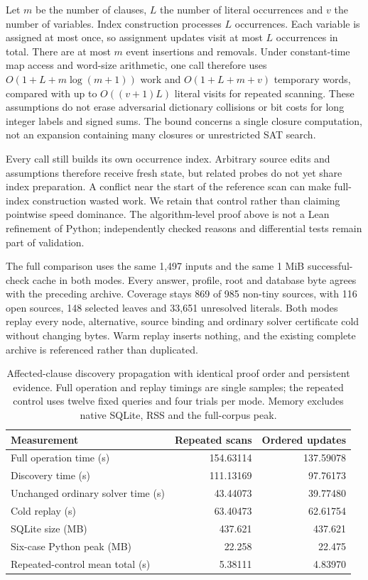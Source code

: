 \documentclass[11pt,a4paper]{article}
\numberwithin{equation}{section}
\theoremstyle{plain}
\theoremstyle{definition}
\theoremstyle{remark}
\begin{document}
Let $m$ be the number of clauses, $L$ the number of literal occurrences and $v$ the number of variables. Index construction processes $L$ occurrences. Each variable is assigned at most once, so assignment updates visit at most $L$ occurrences in total. There are at most $m$ event insertions and removals. Under constant-time map access and word-size arithmetic, one call therefore uses $O(1+L+m\log(m+1))$ work and $O(1+L+m+v)$ temporary words, compared with up to $O((v+1)L)$ literal visits for repeated scanning. These assumptions do not erase adversarial dictionary collisions or bit costs for long integer labels and signed sums. The bound concerns a single closure computation, not an expansion containing many closures or unrestricted SAT search.

Every call still builds its own occurrence index. Arbitrary source edits and assumptions therefore receive fresh state, but related probes do not yet share index preparation. A conflict near the start of the reference scan can make full-index construction wasted work. We retain that control rather than claiming pointwise speed dominance. The algorithm-level proof above is not a Lean refinement of Python; independently checked reasons and differential tests remain part of validation.

The full comparison uses the same 1,497 inputs and the same 1 MiB successful-check cache in both modes. Every answer, profile, root and database byte agrees with the preceding archive. Coverage stays 869 of 985 non-tiny sources, with 116 open sources, 148 selected leaves and 33,651 unresolved literals. Both modes replay every node, alternative, source binding and ordinary solver certificate cold without changing bytes. Warm replay inserts nothing, and the existing complete archive is referenced rather than duplicated.

\begin{table}[t]
\centering
\small
\begin{tabular}{lrr}
\toprule
Measurement & Repeated scans & Ordered updates \\
\midrule
Full operation time (s) & 154.63114 & 137.59078 \\
Discovery time (s) & 111.13169 & 97.76173 \\
Unchanged ordinary solver time (s) & 43.44073 & 39.77480 \\
Cold replay (s) & 63.40473 & 62.61754 \\
SQLite size (MB) & 437.621 & 437.621 \\
Six-case Python peak (MB) & 22.258 & 22.475 \\
Repeated-control mean total (s) & 5.38111 & 4.83970 \\
\bottomrule
\end{tabular}
\caption{Affected-clause discovery propagation with identical proof order and persistent evidence. Full operation and replay timings are single samples; the repeated control uses twelve fixed queries and four trials per mode. Memory excludes native SQLite, RSS and the full-corpus peak.}
\label{tab:ordered-propagation}
\end{table}
\end{document}
